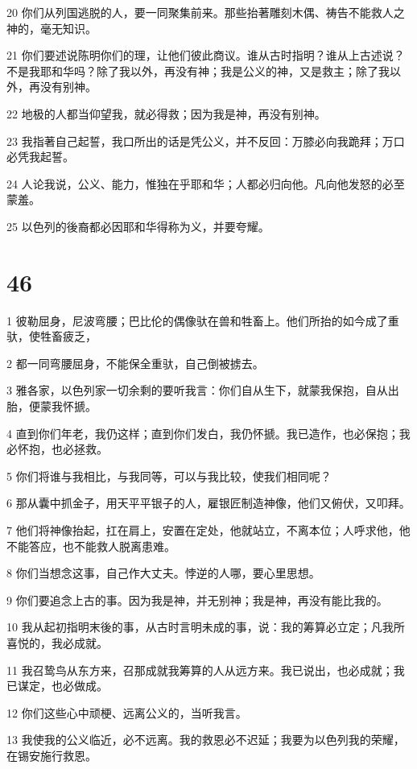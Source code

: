 \par 20 你们从列国逃脱的人，要一同聚集前来。那些抬著雕刻木偶、祷告不能救人之神的，毫无知识。
\par 21 你们要述说陈明你们的理，让他们彼此商议。谁从古时指明？谁从上古述说？不是我耶和华吗？除了我以外，再没有神；我是公义的神，又是救主；除了我以外，再没有别神。
\par 22 地极的人都当仰望我，就必得救；因为我是神，再没有别神。
\par 23 我指著自己起誓，我口所出的话是凭公义，并不反回：万膝必向我跪拜；万口必凭我起誓。
\par 24 人论我说，公义、能力，惟独在乎耶和华；人都必归向他。凡向他发怒的必至蒙羞。
\par 25 以色列的後裔都必因耶和华得称为义，并要夸耀。

\chapter{46}

\par 1 彼勒屈身，尼波弯腰；巴比伦的偶像驮在兽和牲畜上。他们所抬的如今成了重驮，使牲畜疲乏，
\par 2 都一同弯腰屈身，不能保全重驮，自己倒被掳去。
\par 3 雅各家，以色列家一切余剩的要听我言：你们自从生下，就蒙我保抱，自从出胎，便蒙我怀搋。
\par 4 直到你们年老，我仍这样；直到你们发白，我仍怀搋。我已造作，也必保抱；我必怀抱，也必拯救。
\par 5 你们将谁与我相比，与我同等，可以与我比较，使我们相同呢？
\par 6 那从囊中抓金子，用天平平银子的人，雇银匠制造神像，他们又俯伏，又叩拜。
\par 7 他们将神像抬起，扛在肩上，安置在定处，他就站立，不离本位；人呼求他，他不能答应，也不能救人脱离患难。
\par 8 你们当想念这事，自己作大丈夫。悖逆的人哪，要心里思想。
\par 9 你们要追念上古的事。因为我是神，并无别神；我是神，再没有能比我的。
\par 10 我从起初指明末後的事，从古时言明未成的事，说：我的筹算必立定；凡我所喜悦的，我必成就。
\par 11 我召鸷鸟从东方来，召那成就我筹算的人从远方来。我已说出，也必成就；我已谋定，也必做成。
\par 12 你们这些心中顽梗、远离公义的，当听我言。
\par 13 我使我的公义临近，必不远离。我的救恩必不迟延；我要为以色列我的荣耀，在锡安施行救恩。

